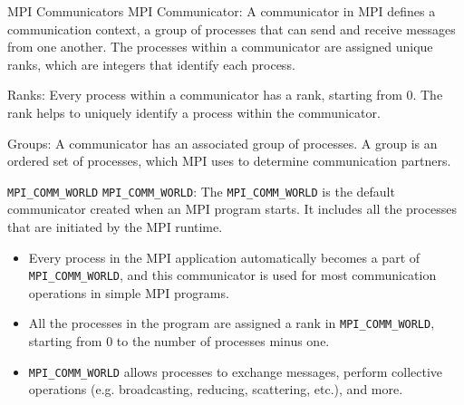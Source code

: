 \documentclass{beamer}
\begin{document}
\begin{frame}[fragile]{MPI Communicators}
  MPI Communicator: A communicator in MPI defines a communication context, a group of processes that can send and receive messages from one another. The processes within a communicator are assigned unique ranks, which are integers that identify each process.

  Ranks: Every process within a communicator has a rank, starting from 0. The rank helps to uniquely identify a process within the communicator.

  Groups: A communicator has an associated group of processes. A group is an ordered set of processes, which MPI uses to determine communication partners.
\end{frame}

\begin{frame}[fragile]{\texttt{MPI\_COMM\_WORLD}}
  \texttt{MPI\_COMM\_WORLD}: The \texttt{MPI\_COMM\_WORLD} is the default communicator created when an MPI program starts. It includes all the processes that are initiated by the MPI runtime.
  \begin{itemize}
    \item Every process in the MPI application automatically becomes a part of \texttt{MPI\_COMM\_WORLD}, and this communicator is used for most communication operations in simple MPI programs.
    \item All the processes in the program are assigned a rank in \texttt{MPI\_COMM\_WORLD}, starting from 0 to the number of processes minus one.
    \item \texttt{MPI\_COMM\_WORLD} allows processes to exchange messages, perform collective operations (e.g. broadcasting, reducing, scattering, etc.), and more.
  \end{itemize}
\end{frame}
\end{document}
